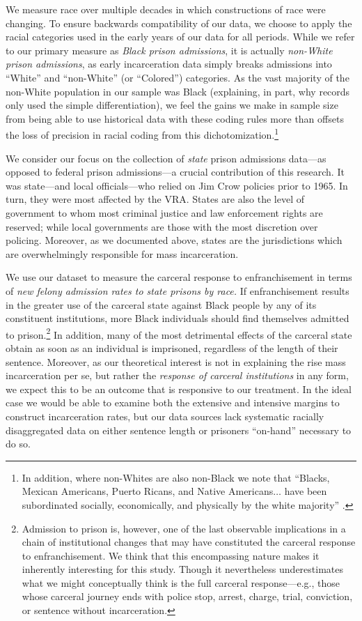 \documentclass[12pt]{article}
\begin{document}
We measure race over multiple decades in which constructions of race were changing.  To ensure backwards compatibility of our data, we choose to apply the racial categories used in the early years of our data for all periods.  While we refer to our primary measure as \emph{Black prison admissions}, it is actually \emph{non-White prison admissions}, as early incarceration data simply breaks admissions into ``White'' and ``non-White'' (or ``Colored'') categories. As the vast majority of the non-White population in our sample was Black (explaining, in part, why records only used the simple differentiation), we feel the gains we make in sample size from being able to use historical data with these coding rules more than offsets the loss of precision in racial coding from this dichotomization.\footnote{In addition, where non-Whites are also non-Black we note that ``Blacks, Mexican Americans, Puerto Ricans, and Native Americans$\ldots$ have been subordinated socially, economically, and physically by the white majority''  \citep[10]{CivilRightsCommission:1975vd}.}

We consider our focus on the collection of \emph{state} prison admissions data---as opposed to federal prison admissions---a crucial contribution of this research.  It was state---and local officials---who relied on Jim Crow policies prior to 1965.  In turn, they were most affected by the VRA.  States are also the level of government to whom most criminal justice and law enforcement rights are reserved; while local governments are those with the most discretion over policing.  Moreover, as we documented above, states are the jurisdictions which are overwhelmingly responsible for mass incarceration.

We use our dataset to measure the carceral response to enfranchisement in terms of \emph{new felony admission rates to state prisons by race.}   If enfranchisement results in the greater use of the carceral state against Black people by any of its constituent institutions, more Black individuals should find themselves admitted to prison.\footnote{Admission to prison is, however, one of the last observable implications in a chain of institutional changes that may have constituted the carceral response to enfranchisement.  We think that this encompassing nature makes it inherently interesting for this study.  Though it nevertheless underestimates what we might conceptually think is the full carceral response---e.g., those whose carceral journey ends with police stop, arrest, charge, trial, conviction, or sentence without incarceration.}  In addition, many of the most detrimental effects of the carceral state obtain as soon as an individual is imprisoned, regardless of the length of their sentence. Moreover, as our theoretical interest is not in explaining the rise mass incarceration per se, but rather the \emph{response of carceral institutions} in any form, we expect this to be an outcome that is responsive to our treatment.  In the ideal case we would be able to examine both the extensive and intensive margins to construct incarceration rates, but our data sources lack systematic racially disaggregated data on either sentence length or prisoners ``on-hand'' necessary to do so.
\end{document}
